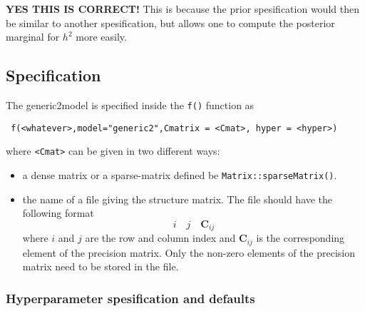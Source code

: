 \documentclass[a4paper,11pt]{article}
\begin{document}
\textbf{YES THIS IS CORRECT!} This is because the prior spesification
would then be similar to another spesification, but allows one to
compute the posterior marginal for $h^{2}$ more easily.

\subsection*{Specification}

The generic2model is specified inside the {\tt f()} function as
\begin{verbatim}
 f(<whatever>,model="generic2",Cmatrix = <Cmat>, hyper = <hyper>)
\end{verbatim}
where {\tt <Cmat>} can be given in two different ways:
\begin{itemize}
\item a dense matrix or a sparse-matrix defined be
    \texttt{Matrix::sparseMatrix()}.
\item the name of a file giving the structure matrix. The file should
    have the following format
    \[
    i\quad j\quad \mathbf{C}_{ij}
    \]
    where $i$ and $j$ are the row and column index and
    $\mathbf{C}_{ij}$ is the corresponding element of the precision
    matrix. Only the non-zero elements of the precision matrix need to
    be stored in the file.
\end{itemize}

\subsubsection*{Hyperparameter spesification and defaults}

\end{document}
